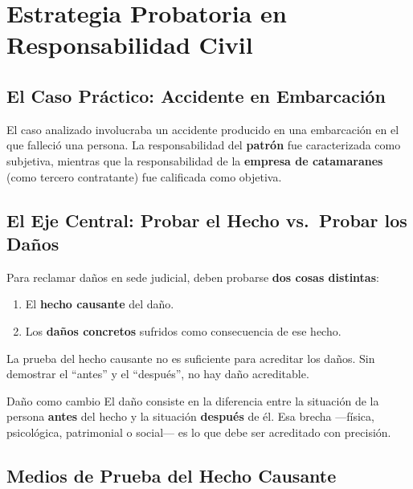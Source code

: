 \documentclass[12pt,oneside]{book}
\begin{document}
\chapter{Estrategia Probatoria en Responsabilidad Civil}

\section{El Caso Práctico: Accidente en Embarcación}

El caso analizado involucraba un accidente producido en una embarcación en el que falleció una persona. La responsabilidad del \textbf{patrón} fue caracterizada como subjetiva, mientras que la responsabilidad de la \textbf{empresa de catamaranes} (como tercero contratante) fue calificada como objetiva.

\section{El Eje Central: Probar el Hecho vs.\ Probar los Daños}

\begin{important}
Para reclamar daños en sede judicial, deben probarse \textbf{dos cosas distintas}:
\begin{enumerate}
    \item El \textbf{hecho causante} del daño.
    \item Los \textbf{daños concretos} sufridos como consecuencia de ese hecho.
\end{enumerate}
La prueba del hecho causante no es suficiente para acreditar los daños. Sin demostrar el ``antes'' y el ``después'', no hay daño acreditable.
\end{important}

\begin{definition}{Daño como cambio}
El daño consiste en la diferencia entre la situación de la persona \textbf{antes} del hecho y la situación \textbf{después} de él. Esa brecha —física, psicológica, patrimonial o social— es lo que debe ser acreditado con precisión.
\end{definition}

\section{Medios de Prueba del Hecho Causante}
\end{document}
